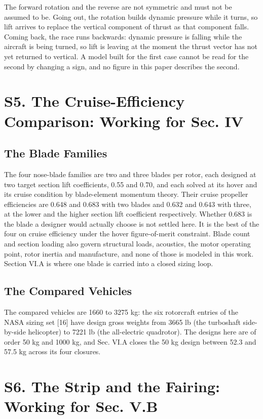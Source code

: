 \documentclass[journal]{new-aiaa}
\begin{document}
The forward rotation and the reverse are not symmetric and must not be assumed to be. Going out, the rotation builds dynamic pressure while it turns, so lift arrives to replace the vertical component of thrust as that component falls. Coming back, the race runs backwards: dynamic pressure is falling while the aircraft is being turned, so lift is leaving at the moment the thrust vector has not yet returned to vertical. A model built for the first case cannot be read for the second by changing a sign, and no figure in this paper describes the second.

\section*{S5. The Cruise-Efficiency Comparison: Working for Sec. IV}

\subsection*{The Blade Families}

The four nose-blade families are two and three blades per rotor, each designed at two target section lift coefficients, 0.55 and 0.70, and each solved at its hover and its cruise condition by blade-element momentum theory. Their cruise propeller efficiencies are 0.648 and 0.683 with two blades and 0.632 and 0.643 with three, at the lower and the higher section lift coefficient respectively. Whether 0.683 is the blade a designer would actually choose is not settled here. It is the best of the four on cruise efficiency under the hover figure-of-merit constraint. Blade count and section loading also govern structural loads, acoustics, the motor operating point, rotor inertia and manufacture, and none of those is modeled in this work. Section VI.A is where one blade is carried into a closed sizing loop.

\subsection*{The Compared Vehicles}

The compared vehicles are 1660 to 3275 kg: the six rotorcraft entries of the NASA sizing set [16] have design gross weights from 3665 lb (the turboshaft side-by-side helicopter) to 7221 lb (the all-electric quadrotor). The designs here are of order 50 kg and 1000 kg, and Sec. VI.A closes the 50 kg design between 52.3 and 57.5 kg across its four closures.

\section*{S6. The Strip and the Fairing: Working for Sec. V.B}
\end{document}
